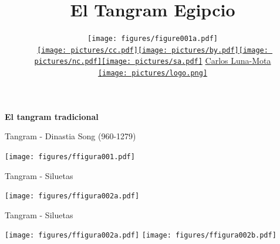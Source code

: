 \documentclass[14pt,aspectratio=169,usenames,dvipsnames]{beamer}
\title{El Tangram Egipcio\vspace{-0.5em}}
\author{
    \texttt{[image: figures/figure001a.pdf]}\\[-0.25ex]
    {\small \href{https://creativecommons.org/licenses/by-nc-sa/4.0/}{\texttt{[image: pictures/cc.pdf]}\texttt{[image: pictures/by.pdf]}\texttt{[image: pictures/nc.pdf]}\texttt{[image: pictures/sa.pdf]}} \href{https://github.com/CarlosLunaMota}{Carlos Luna-Mota}}\\
    \vspace{0.55em}
    \href{https://mmaca.cat/}{\texttt{[image: pictures/logo.png]}}
    \vspace{-1.85em}}
\date{}
\begin{document}

    \begin{frame}
        \titlepage
    \end{frame}


    \begin{frame}{}
        \begin{center}
            \textbf{\huge El tangram tradicional}
        \end{center}
    \end{frame}


    \begin{frame}{Tangram - Dinastia Song (960-1279)}
        \begin{center}
            \texttt{[image: figures/ffigura001.pdf]} \\
        \end{center}
    \end{frame}


    \begin{frame}{Tangram - Siluetas}
        \begin{center}
            \texttt{[image: figures/ffigura002a.pdf]} \quad {} \\
        \end{center}
    \end{frame}


    \begin{frame}{Tangram - Siluetas}
        \begin{center}
            \texttt{[image: figures/ffigura002a.pdf]} \quad \texttt{[image: figures/ffigura002b.pdf]} \\
        \end{center}
    \end{frame}

\end{document}
